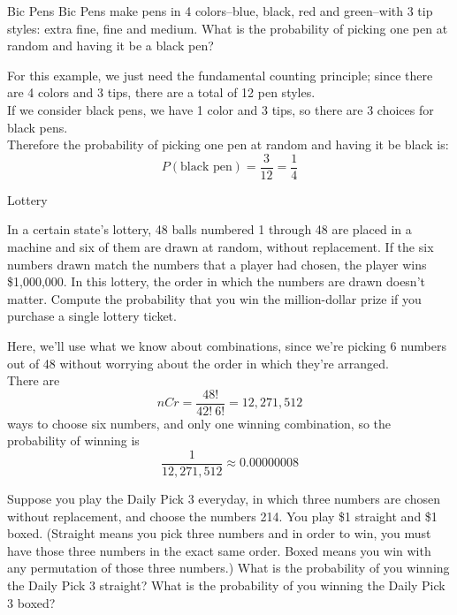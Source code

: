 \begin{example}[https://www.youtube.com/watch?v=d0PaAz2Ro4k]{Bic Pens}
Bic Pens make pens in 4 colors--blue, black, red and green--with 3 tip styles: extra fine, fine and medium. What is the probability of picking one pen at random and having
it be a black pen?

\sol
For this example, we just need the fundamental counting principle; since there are 4 colors and 3 tips, there are a total of 12 pen styles.\\

If we consider black pens, we have 1 color and 3 tips, so there are 3 choices for black pens.\\

Therefore the probability of picking one pen at random and having
it be black is:
\[P(\mbox{black pen}) = \boxed{\frac{3}{12} = \frac{1}{4}}\]
\end{example}

\begin{example}[https://www.youtube.com/watch?v=qJExejyTNzY]{Lottery}

In a certain state's lottery, 48 balls numbered 1 through 48 are placed in a machine and six of them are drawn at random, without replacement. If the six numbers drawn match the numbers that a player had chosen, the player wins \$1,000,000. In this lottery, the order in which the numbers are drawn doesn't matter. Compute the probability that you win the million-dollar prize if you purchase a single lottery ticket.

\sol
Here, we'll use what we know about combinations, since we're picking 6 numbers out of 48 without worrying about the order in which they're arranged.\\

There are \[nCr = \dfrac{48!}{42! \ 6!} = 12,271,512\] ways to choose six numbers, and only one winning combination, so the probability of winning is \[\boxed{\dfrac{1}{12,271,512} \approx 0.00000008}\]
\end{example}

\begin{try}
Suppose you play the Daily Pick 3 everyday, in which three numbers are chosen without replacement, and choose the numbers 214.
You play \$1 straight and \$1 boxed. (Straight means you pick three numbers and in order to
win, you must have those three numbers in the exact same order. Boxed means you win with
any permutation of those three numbers.) What is the probability of you winning the Daily
Pick 3 straight? What is the probability of you winning the Daily Pick 3 boxed?
\end{try}

